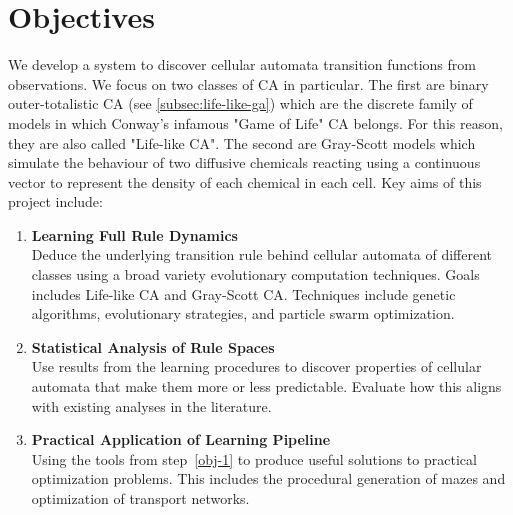 \section{Objectives}
We develop a system to discover cellular automata transition functions from observations. We focus on two classes of CA in particular. The first are binary outer-totalistic CA (see \ref{subsec:life-like-ga}) which are the discrete family of models in which Conway's infamous "Game of Life" CA belongs. For this reason, they are also called "Life-like CA". The second are Gray-Scott models which simulate the behaviour of two diffusive chemicals reacting using a continuous vector to represent the density of each chemical in each cell. Key aims of this project include:
\begin{enumerate}
    \item \textbf{Learning Full Rule Dynamics}\label{obj-1}\\
    Deduce the underlying transition rule behind cellular automata of different classes using a broad variety evolutionary computation techniques. Goals includes Life-like CA and Gray-Scott CA. Techniques include genetic algorithms, evolutionary strategies, and particle swarm optimization.
    \item \textbf{Statistical Analysis of Rule Spaces}\\
    Use results from the learning procedures to discover properties of cellular automata that make them more or less predictable. Evaluate how this aligns with existing analyses in the literature.
    \item \textbf{Practical Application of Learning Pipeline}\\
    Using the tools from step~\ref{obj-1} to produce useful solutions to practical optimization problems. This includes the procedural generation of mazes and optimization of transport networks.
\end{enumerate}

